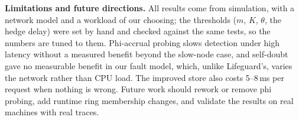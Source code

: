 \documentclass[sigconf,nonacm]{acmart}
\begin{document}
\textbf{Limitations and future directions.} All results come from simulation, with a network model and a workload of our choosing; the thresholds ($m$, $K$, $\theta$, the hedge delay) were set by hand and checked against the same tests, so the numbers are tuned to them. Phi-accrual probing slows detection under high latency without a measured benefit beyond the slow-node case, and self-doubt gave no measurable benefit in our fault model, which, unlike Lifeguard's, varies the network rather than CPU load. The improved store also costs 5--8\,ms per request when nothing is wrong. Future work should rework or remove phi probing, add runtime ring membership changes, and validate the results on real machines with real traces.



\end{document}

